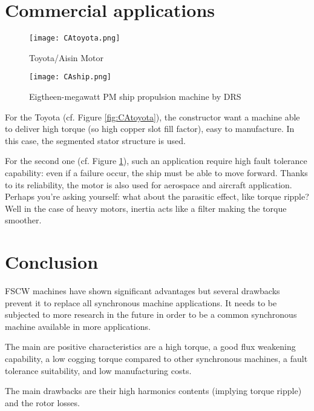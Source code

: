 \section{Commercial applications}
\begin{figure}[H]
    \begin{minipage}{0.49 \textwidth}
        \centering
        \texttt{[image: CAtoyota.png]}
        \caption{Toyota/Aisin Motor}
        \label{fig:CAtoyota}
    \end{minipage}
    \begin{minipage}{0.49 \textwidth}
        \centering
    \texttt{[image: CAship.png]}
        \caption{Eigtheen-megawatt PM ship propulsion machine by DRS}
        \label{fig:CAship}
    \end{minipage}
\end{figure}
For the Toyota (cf. Figure \ref{fig:CAtoyota}), the constructor want a machine able to deliver high torque (so high copper slot fill factor), easy to manufacture. In this case, the segmented stator structure is used.

For the second one (cf. Figure \ref{fig:CAship}), such an application require high fault tolerance capability: even if a failure occur, the ship must be able to move forward. Thanks to its reliability, the motor is also used for aerospace and aircraft application. Perhaps you’re asking yourself: what about the parasitic effect, like torque ripple? Well in the case of heavy motors, inertia acts like a filter making the torque smoother.

\section{Conclusion}

FSCW machines have shown significant advantages but several drawbacks prevent it to replace all synchronous machine applications. It needs to be subjected to more research in the future in order to be a common synchronous machine available in more applications.

The main are positive characteristics are a high torque, a good flux weakening capability, a low cogging torque compared to other synchronous machines, a fault tolerance suitability, and low manufacturing costs.

The main drawbacks are their high harmonics contents (implying torque ripple) and the rotor losses.
